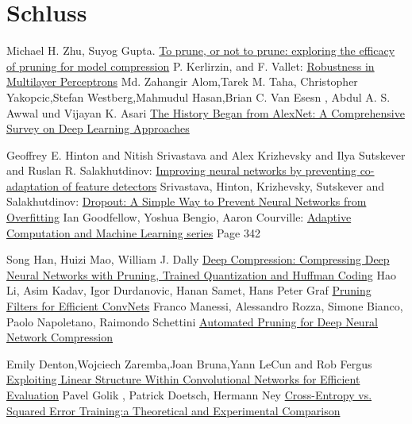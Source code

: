 \documentclass[12pt,a4paper]{scrartcl}
\numberwithin{equation}{section}
\begin{document}
\section{Schluss}


\begin{thebibliography}{lem00}
		Michael H. Zhu, Suyog Gupta.
		\href{https://www.arxiv-vanity.com/papers/1710.01878/}{To prune, or not to prune: exploring the efficacy of pruning for model compression}
	P. Kerlirzin, and F. Vallet: \href{ https://www.mitpressjournals.org/doi/abs/10.1162/neco.1993.5.3.473?journalCode=neco} {Robustness in Multilayer Perceptrons}
		Md. Zahangir Alom,Tarek M. Taha, Christopher Yakopcic,Stefan Westberg,Mahmudul Hasan,Brian C. Van Esesn , Abdul A. S. Awwal und Vijayan K. Asari \href{https://arxiv.org/abs/1803.01164}{The History Began from AlexNet: A Comprehensive Survey on Deep Learning Approaches}
	
 	Geoffrey E. Hinton and Nitish Srivastava and Alex Krizhevsky and Ilya Sutskever and Ruslan R. Salakhutdinov: \href{https://arxiv.org/abs/1207.0580}{Improving neural networks by preventing co-adaptation of feature detectors}
 	Srivastava, Hinton, Krizhevsky, Sutskever and Salakhutdinov: \href{http://jmlr.org/papers/volume15/srivastava14a.old/srivastava14a.pdf}{Dropout: A Simple Way to Prevent Neural Networks from Overfitting}
Ian Goodfellow, Yoshua Bengio, Aaron Courville:
\href{https://www.amazon.com/Deep-Learning-Adaptive-Computation-Machine/dp/0262035618/ref=as_li_ss_tl?ieTF8&qid=1548018253&sr=8-3&keywords=deep+learning&linkCode=sl1&tag=inspiredalgor-20&linkId=49b3b1cce7e04bb3c9b99f2d878bf805&language=en_US}{Adaptive Computation and Machine Learning series} Page 342
 
	 Song Han, Huizi Mao, William J. Dally \href{https://arxiv.org/abs/1510.00149}{Deep Compression: Compressing Deep Neural Networks with Pruning, Trained Quantization and Huffman Coding}
 	Hao Li, Asim Kadav, Igor Durdanovic, Hanan Samet, Hans Peter Graf
 	\href{https://arxiv.org/abs/1608.08710}{Pruning Filters for Efficient ConvNets}
      Franco Manessi, Alessandro Rozza, Simone Bianco, Paolo Napoletano, Raimondo Schettini \href{https://arxiv.org/abs/1712.01721}{Automated Pruning for Deep Neural Network Compression}
      
   		Emily Denton,Wojciech Zaremba,Joan Bruna,Yann LeCun and	Rob Fergus
   		\href{https://arxiv.org/pdf/1404.0736.pdf}{Exploiting Linear Structure Within Convolutional
   			Networks for Efficient Evaluation}
 	 Pavel Golik , Patrick Doetsch, Hermann Ney
 	\href{http://books.jackon.me/Cross-Entropy-vs-Squared-Error-Training-a-Theoretical-and-Experimental-Comparison.pdf}{Cross-Entropy vs. Squared Error Training:a Theoretical and Experimental Comparison}
 	

\end{thebibliography}
\end{document}

